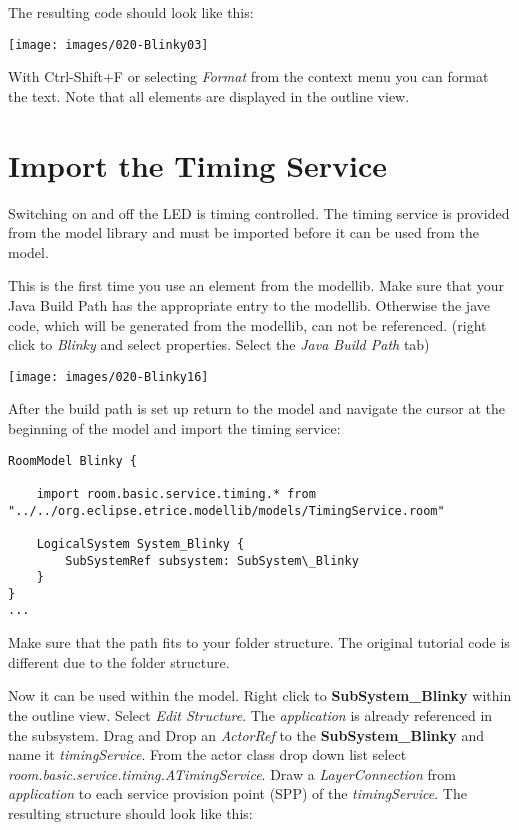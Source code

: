 The resulting code should look like this:

\texttt{[image: images/020-Blinky03]}

With Ctrl-Shift+F or selecting \textit{Format} from the context menu you can format the text. Note that all elements are displayed in the outline view.

\section{Import the Timing Service}

Switching on and off the LED is timing controlled. The timing service is provided from the model library and must be imported before it can be used from the model.

This is the first time you use an element from the modellib. Make sure that your Java Build Path has the appropriate entry to the modellib. Otherwise the jave code, which will be generated from the modellib, can not be referenced.
(right click to \textit{Blinky} and select properties. Select the \textit{Java Build Path} tab) 
  
\texttt{[image: images/020-Blinky16]}

After the build path is set up return to the model and navigate the cursor at the beginning of the model and import the timing service: 

\begin{verbatim}
RoomModel Blinky {
    
    import room.basic.service.timing.* from "../../org.eclipse.etrice.modellib/models/TimingService.room" 
    
    LogicalSystem System_Blinky {
        SubSystemRef subsystem: SubSystem\_Blinky
    }
}
...     
\end{verbatim}

Make sure that the path fits to your folder structure. The original tutorial code is different due to the folder structure.  

Now it can be used within the model. Right click to \textbf{SubSystem\_Blinky} within the outline view. Select \textit{Edit Structure}. The \textit{application} is already referenced in the subsystem. Drag and Drop an \textit{ActorRef} to the \textbf{SubSystem\_Blinky} and name it \textit{timingService}. From the actor class drop down list select \textit{room.basic.service.timing.ATimingService}. Draw a \textit{LayerConnection} from \textit{application} to each service provision point (SPP) of the \textit{timingService}. The resulting structure should look like this:

